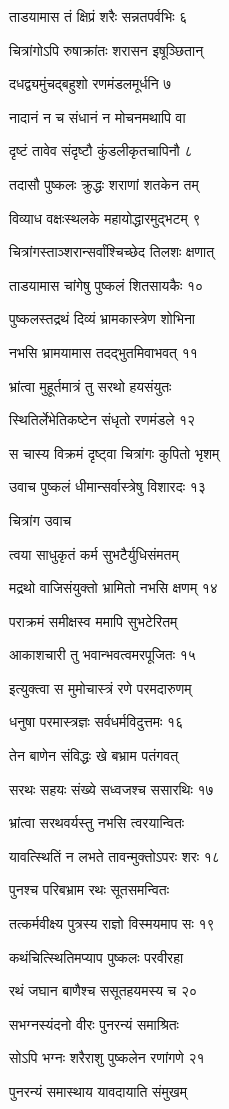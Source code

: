 ताडयामास तं क्षिप्रं शरैः सन्नतपर्वभिः ६

चित्रांगोऽपि रुषाक्रांतः शरासन इषूञ्छितान्

दधद्व्यमुंचद्बहुशो रणमंडलमूर्धनि ७

नादानं न च संधानं न मोचनमथापि वा

दृष्टं तावेव संदृष्टौ कुंडलीकृतचापिनौ ८

तदासौ पुष्कलः क्रुद्धः शराणां शतकेन तम्

विव्याध वक्षःस्थलके महायोद्धारमुद्भटम् ९

चित्रांगस्ताञ्शरान्सर्वांश्चिच्छेद तिलशः क्षणात्

ताडयामास चांगेषु पुष्कलं शितसायकैः १०

पुष्कलस्तद्रथं दिव्यं भ्रामकास्त्रेण शोभिना

नभसि भ्रामयामास तदद्भुतमिवाभवत् ११

भ्रांत्वा मुहूर्तमात्रं तु सरथो हयसंयुतः

स्थितिर्लेभेतिकष्टेन संधृतो रणमंडले १२

स चास्य विक्रमं दृष्ट्वा चित्रांगः कुपितो भृशम्

उवाच पुष्कलं धीमान्सर्वास्त्रेषु विशारदः १३

चित्रांग उवाच

त्वया साधुकृतं कर्म सुभटैर्युधिसंमतम्

मद्रथो वाजिसंयुक्तो भ्रामितो नभसि क्षणम् १४

पराक्रमं समीक्षस्व ममापि सुभटेरितम्

आकाशचारी तु भवान्भवत्वमरपूजितः १५

इत्युक्त्वा स मुमोचास्त्रं रणे परमदारुणम्

धनुषा परमास्त्रज्ञः सर्वधर्मविदुत्तमः १६

तेन बाणेन संविद्धः खे बभ्राम पतंगवत्

सरथः सहयः संख्ये सध्वजश्च ससारथिः १७

भ्रांत्वा सरथवर्यस्तु नभसि त्वरयान्वितः

यावत्स्थितिं न लभते तावन्मुक्तोऽपरः शरः १८

पुनश्च परिबभ्राम रथः सूतसमन्वितः

तत्कर्मवीक्ष्य पुत्रस्य राज्ञो विस्मयमाप सः १९

कथंचित्स्थितिमप्याप पुष्कलः परवीरहा

रथं जघान बाणैश्च ससूतहयमस्य च २०

सभग्नस्यंदनो वीरः पुनरन्यं समाश्रितः

सोऽपि भग्नः शरैराशु पुष्कलेन रणांगणे २१

पुनरन्यं समास्थाय यावदायाति संमुखम्

